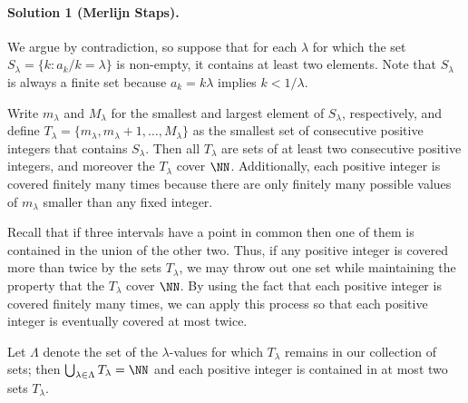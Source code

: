 \documentclass[11pt]{scrartcl}
\begin{document}
\paragraph{Solution 1 (Merlijn Staps).}
We argue by contradiction, so suppose that for each $\lambda$ for which the set
$S_\lambda = \{k : a_k/k = \lambda\}$ is  non-empty, it contains at least two
elements.  Note that $S_\lambda$ is always a finite set because  $a_k =
k\lambda$ implies $k < 1/\lambda$.

Write $m_\lambda$ and $M_\lambda$ for the smallest and largest element of
$S_\lambda$,  respectively, and define $T_\lambda = \{m_\lambda,
m_\lambda+1,\dots,M_\lambda\}$ as the smallest set of consecutive positive
integers  that contains $S_\lambda$.  Then all $T_\lambda$ are sets of at least
two consecutive positive integers, and moreover the $T_\lambda$ cover
$\NN$. Additionally, each positive integer is covered finitely many times
because there are only finitely many possible values of $m_{\lambda}$ smaller
than any fixed integer.

Recall that if three intervals have a point in common then one
of them is contained in the union of the other two. Thus, if any positive
integer is covered more than twice by the sets $T_{\lambda}$, we may throw out
one set while maintaining the property that the $T_{\lambda}$
cover $\NN$. By using the fact that each positive integer is covered
finitely many times, we can apply this process so that each positive integer is
eventually covered at most twice.

Let $\Lambda$ denote the set
of the $\lambda$-values for which $T_\lambda$ remains in our collection of sets;
then $\bigcup_{\lambda \in \Lambda} T_\lambda = \NN$ and each positive
integer is contained in at most two sets $T_\lambda$.
\end{document}
